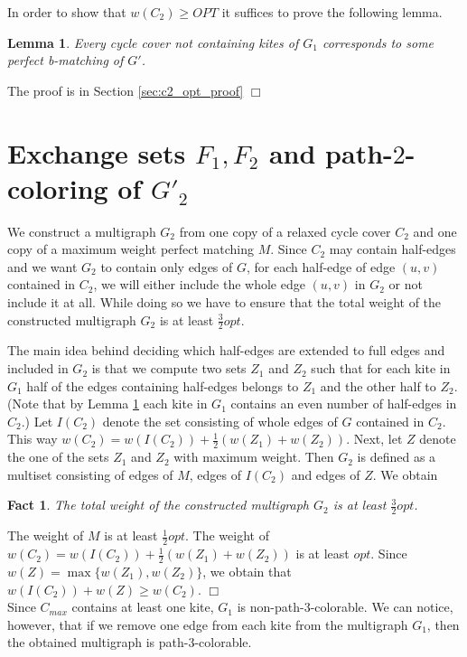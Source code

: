\documentclass[a4, 11pt]{article}
\newcommand{\dowod}{\noindent{\bf Proof.~}}
\newcommand{\koniec}{\hfill $\Box$\\[.1ex]}
\newcommand{\<}{\langle}
\renewcommand{\>}{\rangle}
\newtheorem{fact}{Fact}
\newtheorem{lemma}{Lemma}
\begin{document}
In order to show that $w(C_2) \geq OPT$ it suffices to prove the following lemma.
\begin{lemma}
\label{lem:cycle_cover_optimality}
Every cycle cover not containing kites of $G_1$ corresponds to some  perfect b-matching of $G'$.
\end{lemma} 
The proof is in Section \ref{sec:c2_opt_proof} \koniec


\section{Exchange sets $F_1, F_2$ and path-$2$-coloring of $G'_2$}

We construct a multigraph $G_2$ from one copy of  a relaxed cycle cover $C_2$ and one copy of a maximum weight perfect matching $M$.
Since $C_2$ may contain half-edges and we want $G_2$ to  contain only edges of $G$, for each half-edge of edge $(u,v)$ contained in $C_2$, we will either include the whole edge $(u,v)$ in $G_2$ or not include it at all. While doing so we have to ensure that the total weight of the constructed multigraph $G_2$ is at least $\frac 32 opt$. 

 The main idea behind deciding which half-edges are extended to full edges and included in $G_2$ is that we compute two sets $Z_1$ and  $Z_2$ such that for each kite in $G_1$ half of the edges containing half-edges belongs to $Z_1$ and the other half to $Z_2$. (Note that by Lemma \ref{} each kite in $G_1$ contains an even number of half-edges in $C_2$.) Let $I(C_2)$ denote the set consisting of whole edges of $G$ contained in $C_2$. This way $w(C_2)= w(I(C_2)) +\frac 12 (w(Z_1)+w(Z_2))$. Next, let $Z$ denote the one of the sets $Z_1$ and $Z_2$ with maximum  weight. Then $G_2$ is defined as a multiset consisting of edges of $M$, edges of $I(C_2)$ and edges of $Z$. We obtain

\begin{fact}
The total weight of the constructed multigraph $G_2$ is at least $\frac 32 opt$.
\end{fact} 
\dowod
The weight of $M$ is at least $\frac 12 opt$. The weight of $w(C_2)= w(I(C_2)) +\frac 12 (w(Z_1)+w(Z_2))$ is at least $opt$. Since $w(Z) = \max\{w(Z_1), w(Z_2)\}$, we obtain
that $w(I(C_2))+ w(Z) \geq w(C_2)$. \koniec



Since $C_{max}$ contains at least one kite, $G_1$ is non-path-$3$-colorable. We can notice, however, that if we remove one edge from each kite from the multigraph $G_1$, then the obtained multigraph is path-$3$-colorable. 
\end{document}
